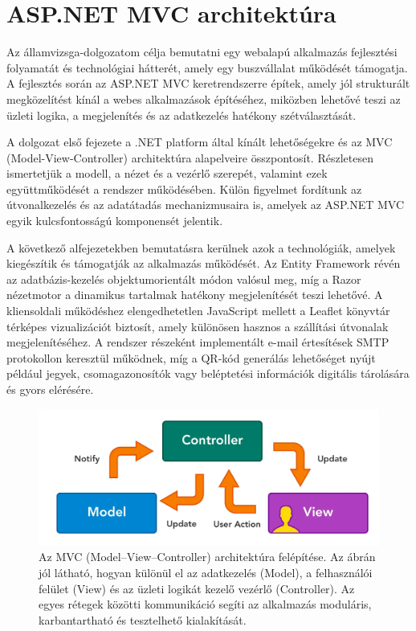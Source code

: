 
\section{ASP.NET MVC architektúra}

\indent Az államvizsga-dolgozatom célja bemutatni egy webalapú alkalmazás fejlesztési folyamatát és technológiai hátterét, amely egy buszvállalat működését támogatja. A fejlesztés során az ASP.NET MVC keretrendszerre építek, amely jól strukturált megközelítést kínál a webes alkalmazások építéséhez, miközben lehetővé teszi az üzleti logika, a megjelenítés és az adatkezelés hatékony szétválasztását.

A dolgozat első fejezete a .NET platform által kínált lehetőségekre és az MVC (Model-View-Controller) architektúra alapelveire összpontosít. Részletesen ismertetjük a modell, a nézet és a vezérlő szerepét, valamint ezek együttműködését a rendszer működésében. Külön figyelmet fordítunk az útvonalkezelés és az adatátadás mechanizmusaira is, amelyek az ASP.NET MVC egyik kulcsfontosságú komponensét jelentik.

A következő alfejezetekben bemutatásra kerülnek azok a technológiák, amelyek kiegészítik és támogatják az alkalmazás működését. Az Entity Framework révén az adatbázis-kezelés objektumorientált módon valósul meg, míg a Razor nézetmotor a dinamikus tartalmak hatékony megjelenítését teszi lehetővé. A kliensoldali működéshez elengedhetetlen JavaScript mellett a Leaflet könyvtár térképes vizualizációt biztosít, amely különösen hasznos a szállítási útvonalak megjelenítéséhez. A rendszer részeként implementált e-mail értesítések SMTP protokollon keresztül működnek, míg a QR-kód generálás lehetőséget nyújt például jegyek, csomagazonosítók vagy beléptetési információk digitális tárolására és gyors elérésére.

\begin{figure}[H]
    \centering
    \includegraphics[width=1\textwidth]{Szakdolgozat/Mellekletek/MVCDiagramm.png}
    \caption{Az MVC (Model–View–Controller) architektúra felépítése. Az ábrán jól látható, hogyan különül el az adatkezelés (Model), a felhasználói felület (View) és az üzleti logikát kezelő vezérlő (Controller). Az egyes rétegek közötti kommunikáció segíti az alkalmazás moduláris, karbantartható és tesztelhető kialakítását.}
    \label{fig:er-diagram}
\end{figure}


